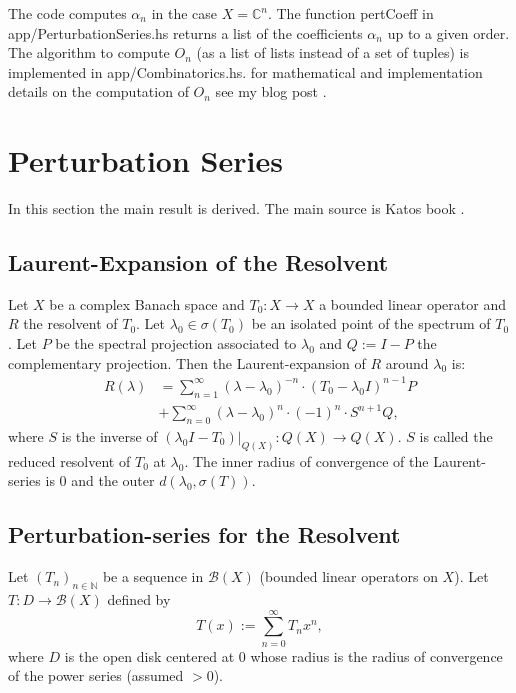 \documentclass[11pt, a4paper]{article} %
\numberwithin{equation}{subsection} %
\theoremstyle{definition} %
\theoremstyle{plain} %
\begin{document}
The code computes $\alpha_n$ in the case $X = \mathbb{C}^n$.
The function pertCoeff in app/PerturbationSeries.hs returns a list of the coefficients $\alpha_n$ up to a given order.
The algorithm to compute $O_n$ (as a list of lists instead of a set of tuples) is implemented in app/Combinatorics.hs.
for mathematical and implementation details on the computation of $O_n$ see my blog post \cite{blog}.

\section{Perturbation Series}
In this section the main result is derived.
The main source is Katos book \cite{kato_perturbation}.
\subsection{Laurent-Expansion of the Resolvent}
Let $X$ be a complex Banach space and $T_0 :X \to X$ a bounded linear
operator and $R$ the resolvent of $T_0$.
Let $ \lambda_0 \in \sigma (T_0)$ be an isolated point of the spectrum
of $T_0$. Let $P$ be the spectral projection associated to $\lambda_0$
and $Q:=I-P$ the complementary projection.
Then the Laurent-expansion of $R$ around $\lambda_0$ is:
\begin{equation}
	\label{eq:resolvent-laurent-expansion}
	\begin{split}
		R(\lambda) &=
		\sum_{n=1}^\infty (\lambda - \lambda_0)^{-n} \cdot (T_0- \lambda_0I)^{n-1} P  \\
		&+ \sum_{n=0}^\infty (\lambda - \lambda_0)^n \cdot (-1)^n \cdot  S^{n+1} Q ,
	\end{split}
\end{equation}
where $S$ is the inverse of $(\lambda_0 I- T_0)|_{Q(X)}: Q(X) \to Q(X)$.
$S$ is called the reduced resolvent of $T_0$ at $\lambda_0$.
The inner radius of convergence of the Laurent-series is $0$ and the outer $d(\lambda_0 , \sigma(T))$.

\subsection{Perturbation-series for the Resolvent}
Let $(T_n)_{n \in \mathbb{N}}$ be a sequence in $\mathscr{B}(X)$ (bounded  linear operators on $X$).
Let $T : D \to \mathscr{B}(X)$ defined by
\begin{equation}
	T(x) := \sum_{n=0}^\infty T_n x^n,
\end{equation}
where $D$ is the open disk centered at 0 whose radius is the radius of
convergence of the power series (assumed $>0$).
\end{document}

